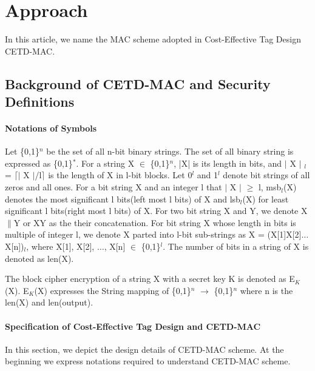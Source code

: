 \documentclass{article}
\begin{document}
\section{Approach}
In this article, we name the MAC scheme adopted in Cost-Effective Tag Design\cite{} CETD-MAC. 
\subsection{Background of CETD-MAC and Security Definitions}
\paragraph{Notations of Symbols}
Let \{0,1\}$^n$ be the set of all n-bit binary strings. The set of all binary string is expressed as \{0,1\}$^*$.  
For a string X $\in$ \{0,1\}$^n$, |X| is its length in bits, and $\vert$ X $\vert$ $_l$ = $\lceil$$\vert$ X $\vert$/l$\rceil$ is the length of X in l-bit blocks.  Let 0$^l$ and 1$^l$ denote bit strings of all zeros and all ones. 
For a bit string X and an integer l that $\vert$ X $\vert$ $\geq$ l, msb$_l$(X) denotes the most significant l bits(left most l bits) of X and lsb$_l$(X) for least significant l bits(right most l bits) of X.
For two bit string X and Y, we denote X$\|$Y  or XY as the their concatenation. For bit string X whose length in bits is multiple of integer l, we denote X parted into l-bit sub-strings as X = (X[1]X[2]$\ldots$X[n])$_l$, where X[1], X[2], $\ldots$, X[n] $\in$ \{0,1\}$^l$.
The number of bits in a string of X is denoted as len(X).

The block cipher encryption of a string X with a secret key K is denoted as E$_K$(X). E$_K$(X) expresses the String mapping of \{0,1\}$^n$ $\rightarrow$ \{0,1\}$^n$ where n is the len(X) and len(output).

\paragraph{Specification of Cost-Effective Tag Design and CETD-MAC}
In this section, we depict the design details of CETD-MAC scheme. At the beginning we express notations required to understand CETD-MAC scheme. 
\end{document}
